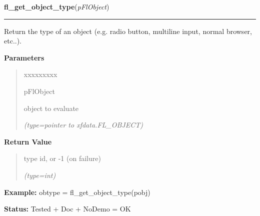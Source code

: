 \hspace{.8\funcindent}\begin{boxedminipage}{\funcwidth}

    \raggedright \textbf{fl\_get\_object\_type}(\textit{pFlObject})

    \vspace{-1.5ex}

    \rule{\textwidth}{0.5\fboxrule}
\setlength{\parskip}{2ex}
    Return the type of an object (e.g. radio button, multiline input, 
    normal browser, etc..).

\setlength{\parskip}{1ex}
      \textbf{Parameters}
      \vspace{-1ex}

      \begin{quote}
        \begin{Ventry}{xxxxxxxxx}

          \item[pFlObject]

          object to evaluate

            {\it (type=pointer to xfdata.FL\_OBJECT)}

        \end{Ventry}

      \end{quote}

      \textbf{Return Value}
    \vspace{-1ex}

      \begin{quote}
      type id, or -1 (on failure)

      {\it (type=int)}

      \end{quote}

\textbf{Example:} obtype = fl\_get\_object\_type(pobj)



\textbf{Status:} Tested + Doc + NoDemo = OK



    \end{boxedminipage}

    \label{xformslib:flbasic:fl_set_object_boxtype}

    \vspace{0.5ex}

